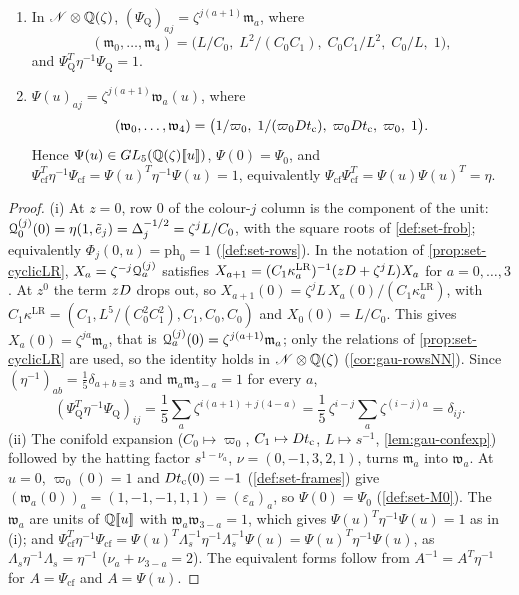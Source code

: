 \begin{lem}
\label{lem:mai-Psi}
\begin{enumerate}
\item In $\mathscr{N}\otimes\mathbb{Q}(\zeta)$, $(\Psi_{\mathrm Q})_{aj}=\zeta^{j(a+1)}\mathfrak m_a$, where
\[
(\mathfrak m_0,\dots,\mathfrak m_4)=\bigl(L/C_0,\;L^2/(C_0C_1),\;C_0C_1/L^2,\;C_0/L,\;1\bigr),
\]
and $\Psi_{\mathrm Q}^T\eta^{-1}\Psi_{\mathrm Q}=1$.
\item $\Psi(u)_{aj}=\zeta^{j(a+1)}\mathfrak w_a(u)$, where
\[
(\mathfrak w_0,\dots,\mathfrak w_4)=\bigl(1/\varpi_0,\;1/(\varpi_0Dt_{\mathrm{c}}),\;\varpi_0Dt_{\mathrm{c}},\;\varpi_0,\;1\bigr).
\]
Hence $\Psi(u)\in GL_5(\mathbb{Q}(\zeta)[\![ u ]\!])$, $\Psi(0)=\Psi_0$, and $\Psi_{\mathrm{cf}}^T\eta^{-1}\Psi_{\mathrm{cf}}=\Psi(u)^T\eta^{-1}\Psi(u)=1$, equivalently $\Psi_{\mathrm{cf}}\Psi_{\mathrm{cf}}^T=\Psi(u)\Psi(u)^T=\eta$.
\end{enumerate}
\end{lem}

\begin{proof}
(i) At $z=0$, row $0$ of the colour-$j$ column is the component of the unit: $\mathcal{Q}^{(j)}_0(0)=\eta(1,\tilde e_j)=\Delta_j^{-1/2}=\zeta^jL/C_0$, with the square roots of \cref{def:set-frob}; equivalently $\Phi_j(0,u)=\mathrm{ph}_0=1$ (\cref{def:set-rows}). In the notation of \cref{prop:set-cyclicLR}, $X_a=\zeta^{-j}\mathcal{Q}^{(j)}_a$ satisfies $X_{a+1}=(C_1\kappa^{\mathrm{LR}}_a)^{-1}(zD+\zeta^jL)X_a$ for $a=0,\dots,3$. At $z^0$ the term $zD$ drops out, so $X_{a+1}(0)=\zeta^jL\,X_a(0)/(C_1\kappa^{\mathrm{LR}}_a)$, with $C_1\kappa^{\mathrm{LR}}=(C_1,L^5/(C_0^2C_1^2),C_1,C_0,C_0)$ and $X_0(0)=L/C_0$. This gives $X_a(0)=\zeta^{ja}\mathfrak m_a$, that is $\mathcal{Q}^{(j)}_a(0)=\zeta^{j(a+1)}\mathfrak m_a$; only the relations of \cref{prop:set-cyclicLR} are used, so the identity holds in $\mathscr{N}\otimes\mathbb{Q}(\zeta)$ (\cref{cor:gau-rowsNN}). Since $(\eta^{-1})_{ab}=\frac15\delta_{a+b\equiv3}$ and $\mathfrak m_a\mathfrak m_{3-a}=1$ for every $a$,
\[
(\Psi_{\mathrm Q}^T\eta^{-1}\Psi_{\mathrm Q})_{ij}=\frac15\sum_a\zeta^{i(a+1)+j(4-a)}=\frac15\,\zeta^{i-j}\sum_a\zeta^{(i-j)a}=\delta_{ij}.
\]
(ii) The conifold expansion ($C_0\mapsto\varpi_0$, $C_1\mapsto Dt_{\mathrm{c}}$, $L\mapsto s^{-1}$, \cref{lem:gau-confexp}) followed by the hatting factor $s^{1-\nu_a}$, $\nu=(0,-1,3,2,1)$, turns $\mathfrak m_a$ into $\mathfrak w_a$. At $u=0$, $\varpi_0(0)=1$ and $Dt_{\mathrm{c}}(0)=-1$ (\cref{def:set-frames}) give $(\mathfrak w_a(0))_a=(1,-1,-1,1,1)=(\varepsilon_a)_a$, so $\Psi(0)=\Psi_0$ (\cref{def:set-M0}). The $\mathfrak w_a$ are units of $\mathbb{Q}[\![ u ]\!]$ with $\mathfrak w_a\mathfrak w_{3-a}=1$, which gives $\Psi(u)^T\eta^{-1}\Psi(u)=1$ as in (i); and $\Psi_{\mathrm{cf}}^T\eta^{-1}\Psi_{\mathrm{cf}}=\Psi(u)^T\Lambda_s^{-1}\eta^{-1}\Lambda_s^{-1}\Psi(u)=\Psi(u)^T\eta^{-1}\Psi(u)$, as $\Lambda_s\eta^{-1}\Lambda_s=\eta^{-1}$ ($\nu_a+\nu_{3-a}=2$). The equivalent forms follow from $A^{-1}=A^T\eta^{-1}$ for $A=\Psi_{\mathrm{cf}}$ and $A=\Psi(u)$.
\end{proof}

